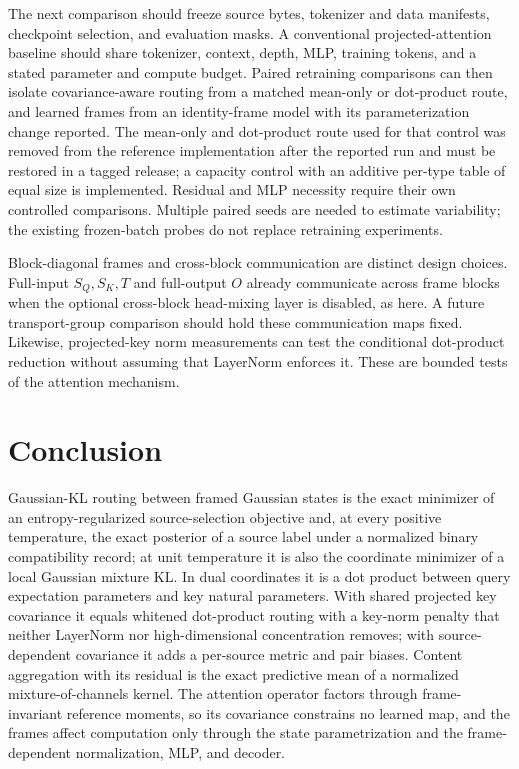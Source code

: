 \documentclass[twoside,11pt]{article}
\begin{document}
The next comparison should freeze source bytes, tokenizer and data manifests, checkpoint selection, and evaluation masks. A conventional projected-attention baseline should share tokenizer, context, depth, MLP, training tokens, and a stated parameter and compute budget. Paired retraining comparisons can then isolate covariance-aware routing from a matched mean-only or dot-product route, and learned frames from an identity-frame model with its parameterization change reported. The mean-only and dot-product route used for that control was removed from the reference implementation after the reported run and must be restored in a tagged release; a capacity control with an additive per-type table of equal size is implemented. Residual and MLP necessity require their own controlled comparisons. Multiple paired seeds are needed to estimate variability; the existing frozen-batch probes do not replace retraining experiments.

Block-diagonal frames and cross-block communication are distinct design choices. Full-input $S_Q,S_K,T$ and full-output $O$ already communicate across frame blocks when the optional cross-block head-mixing layer is disabled, as here. A future transport-group comparison should hold these communication maps fixed. Likewise, projected-key norm measurements can test the conditional dot-product reduction without assuming that LayerNorm enforces it. These are bounded tests of the attention mechanism.

\section{Conclusion}

Gaussian-KL routing between framed Gaussian states is the exact minimizer of an entropy-regularized source-selection objective and, at every positive temperature, the exact posterior of a source label under a normalized binary compatibility record; at unit temperature it is also the coordinate minimizer of a local Gaussian mixture KL. In dual coordinates it is a dot product between query expectation parameters and key natural parameters. With shared projected key covariance it equals whitened dot-product routing with a key-norm penalty that neither LayerNorm nor high-dimensional concentration removes; with source-dependent covariance it adds a per-source metric and pair biases. Content aggregation with its residual is the exact predictive mean of a normalized mixture-of-channels kernel. The attention operator factors through frame-invariant reference moments, so its covariance constrains no learned map, and the frames affect computation only through the state parametrization and the frame-dependent normalization, MLP, and decoder.
\end{document}

